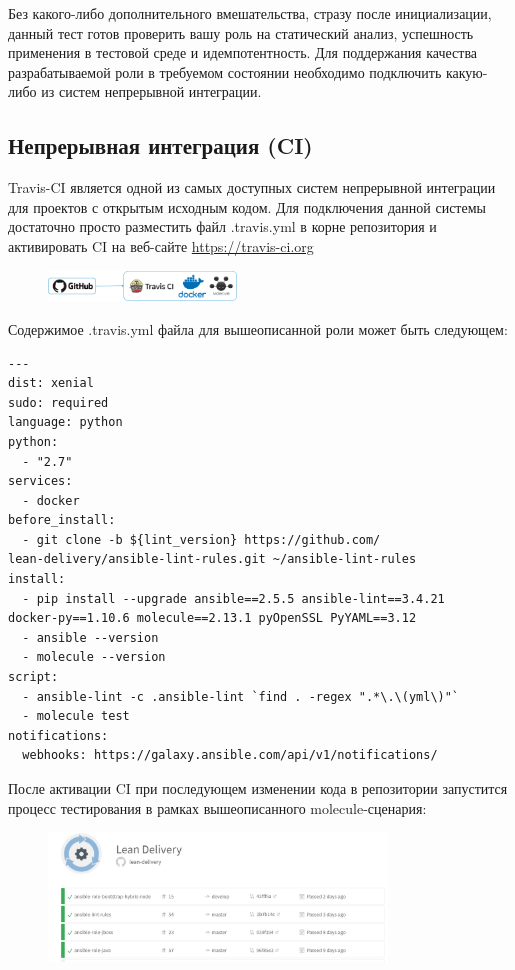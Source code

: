 \documentclass[10pt, a5paper]{article}
\begin{document}
Без какого-либо дополнительного вмешательства, стразу после инициализации, данный тест готов проверить вашу роль на статический анализ, успешность применения в тестовой среде и идемпотентность.
Для поддержания качества разрабатываемой роли в требуемом состоянии необходимо подключить какую-либо из систем непрерывной интеграции.

\subsection*{Непрерывная интеграция (CI)}

Travis-CI является одной из самых доступных систем непрерывной интеграции для проектов с открытым исходным кодом. Для подключения данной системы достаточно просто разместить файл .travis.yml в корне репозитория и активировать CI на веб-сайте \url{https://travis-ci.org}

\begin{center}
\begin{figure}[h!]
  \centering
  \includegraphics[width=5cm]{05_2018_Kharkevich1.png}
  \label{Kharkevich3}
\end{figure}
\end{center} 
Содержимое .travis.yml файла для вышеописанной роли может быть следующем:

\begin{verbatim}
---
dist: xenial
sudo: required
language: python
python:
  - "2.7"
services:
  - docker
before_install:
  - git clone -b ${lint_version} https://github.com/
lean-delivery/ansible-lint-rules.git ~/ansible-lint-rules
install:
  - pip install --upgrade ansible==2.5.5 ansible-lint==3.4.21 
docker-py==1.10.6 molecule==2.13.1 pyOpenSSL PyYAML==3.12
  - ansible --version
  - molecule --version
script:
  - ansible-lint -c .ansible-lint `find . -regex ".*\.\(yml\)"`
  - molecule test
notifications:
  webhooks: https://galaxy.ansible.com/api/v1/notifications/\end{verbatim}
После активации CI при последующем изменении кода в репозитории запустится процесс тестирования в рамках вышеописанного molecule-сценария:

\begin{center}
\begin{figure}[h!]
  \centering
  \includegraphics[width=9cm]{05_2018_Kharkevich2.png}
  \label{Kharkevich4}
\end{figure}
\end{center} 
\end{document}
